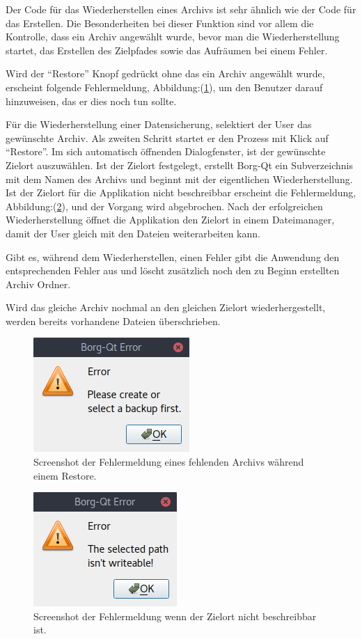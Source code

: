 Der Code für das Wiederherstellen eines Archivs ist sehr ähnlich wie der Code
für das Erstellen. Die Besonderheiten bei dieser Funktion sind vor allem die
Kontrolle, dass ein Archiv angewählt wurde, bevor man die Wiederherstellung
startet, das Erstellen des Zielpfades sowie das Aufräumen bei einem Fehler.

Wird der "`Restore"' Knopf gedrückt ohne das ein Archiv angewählt wurde, erscheint
folgende Fehlermeldung, Abbildung:(\ref{fig:org40b5f27}), um den Benutzer
darauf hinzuweisen, das er dies noch tun sollte.

Für die Wiederherstellung einer Datensicherung, selektiert der User das
gewünschte Archiv. Als zweiten Schritt startet er den Prozess mit Klick auf
"`Restore"'. Im sich automatisch öffnenden Dialogfenster, ist der gewünschte
Zielort auszuwählen. Ist der Zielort festgelegt, erstellt Borg-Qt ein
Subverzeichnis mit dem Namen des Archivs und beginnt mit der eigentlichen
Wiederherstellung. Ist der Zielort für die Applikation nicht beschreibbar
erscheint die Fehlermeldung, Abbildung:(\ref{fig:org49c2dc3}), und der Vorgang
wird abgebrochen. Nach der erfolgreichen Wiederherstellung öffnet die
Applikation den Zielort in einem Dateimanager, damit der User gleich mit den
Dateien weiterarbeiten kann.

Gibt es, während dem Wiederherstellen, einen Fehler gibt die Anwendung den
entsprechenden Fehler aus und löscht zusätzlich noch den zu Beginn erstellten
Archiv Ordner.

Wird das gleiche Archiv nochmal an den gleichen Zielort wiederhergestellt,
werden bereits vorhandene Dateien überschrieben.

\begin{figure}
\centering
\includegraphics[width=.2\paperwidth]{pictures/borgqt_no_archive_selected.png}
\caption{\label{fig:org40b5f27}
Screenshot der Fehlermeldung eines fehlenden Archivs während einem Restore.}
\end{figure}

\begin{figure}
\centering
\includegraphics[width=.2\paperwidth]{pictures/borgqt_not_writeable.png}
\caption{\label{fig:org49c2dc3}
Screenshot der Fehlermeldung wenn der Zielort nicht beschreibbar ist.}
\end{figure}

